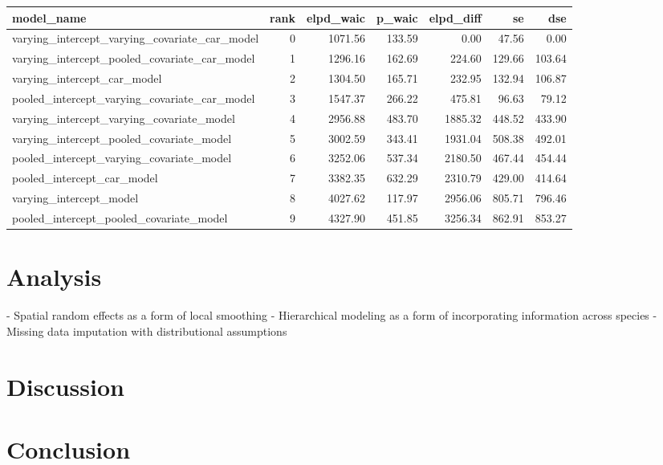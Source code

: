 \documentclass[notitlepage]{article}
\begin{document}
\begin{tabular}{lrrrrrr}
\toprule
model\_name &  rank &  elpd\_waic &  p\_waic &  elpd\_diff &      se &     dse \\
\midrule
varying\_intercept\_varying\_covariate\_car\_model &     0 &    1071.56 &  133.59 &       0.00 &   47.56 &    0.00 \\
varying\_intercept\_pooled\_covariate\_car\_model  &     1 &    1296.16 &  162.69 &     224.60 &  129.66 &  103.64 \\
varying\_intercept\_car\_model                   &     2 &    1304.50 &  165.71 &     232.95 &  132.94 &  106.87 \\
pooled\_intercept\_varying\_covariate\_car\_model  &     3 &    1547.37 &  266.22 &     475.81 &   96.63 &   79.12 \\
varying\_intercept\_varying\_covariate\_model     &     4 &    2956.88 &  483.70 &    1885.32 &  448.52 &  433.90 \\
varying\_intercept\_pooled\_covariate\_model      &     5 &    3002.59 &  343.41 &    1931.04 &  508.38 &  492.01 \\
pooled\_intercept\_varying\_covariate\_model      &     6 &    3252.06 &  537.34 &    2180.50 &  467.44 &  454.44 \\
pooled\_intercept\_car\_model                    &     7 &    3382.35 &  632.29 &    2310.79 &  429.00 &  414.64 \\
varying\_intercept\_model                       &     8 &    4027.62 &  117.97 &    2956.06 &  805.71 &  796.46 \\
pooled\_intercept\_pooled\_covariate\_model       &     9 &    4327.90 &  451.85 &    3256.34 &  862.91 &  853.27 \\
\bottomrule
\end{tabular}


\section{Analysis}

- Spatial random effects as a form of local smoothing
- Hierarchical modeling as a form of incorporating information across species
- Missing data imputation with distributional assumptions

\section{Discussion}

\section{Conclusion}

\printbibliography
\end{document}
